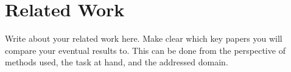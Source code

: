 \section{Related Work}
\label{sec:related_work}
Write about your related work here. Make clear which key papers you will compare your eventual results to. This can be done from the perspective of methods used, the task at hand, and the addressed domain.